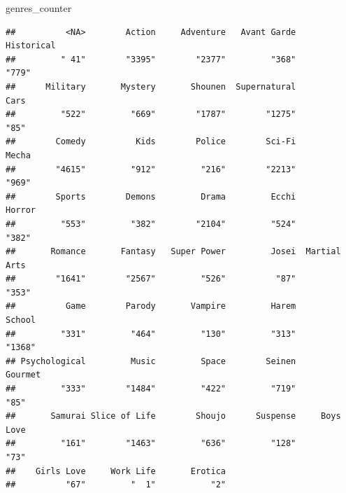 \documentclass[
]{article}
\newenvironment{Shaded}{\begin{snugshade}}{\end{snugshade}}
\newcommand{\AttributeTok}[1]{\textcolor[rgb]{0.77,0.63,0.00}{#1}}
\newcommand{\CommentTok}[1]{\textcolor[rgb]{0.56,0.35,0.01}{\textit{#1}}}
\newcommand{\DecValTok}[1]{\textcolor[rgb]{0.00,0.00,0.81}{#1}}
\newcommand{\FunctionTok}[1]{\textcolor[rgb]{0.00,0.00,0.00}{#1}}
\newcommand{\NormalTok}[1]{#1}
\newcommand{\OtherTok}[1]{\textcolor[rgb]{0.56,0.35,0.01}{#1}}
\newcommand{\SpecialCharTok}[1]{\textcolor[rgb]{0.00,0.00,0.00}{#1}}
\begin{document}
\begin{Shaded}
\begin{Highlighting}[]
\NormalTok{genres\_counter}
\end{Highlighting}
\end{Shaded}

\begin{verbatim}
##          <NA>        Action     Adventure   Avant Garde    Historical 
##         " 41"        "3395"        "2377"         "368"         "779" 
##      Military       Mystery       Shounen  Supernatural          Cars 
##         "522"         "669"        "1787"        "1275"          "85" 
##        Comedy          Kids        Police        Sci-Fi         Mecha 
##        "4615"         "912"         "216"        "2213"         "969" 
##        Sports        Demons         Drama         Ecchi        Horror 
##         "553"         "382"        "2104"         "524"         "382" 
##       Romance       Fantasy   Super Power         Josei  Martial Arts 
##        "1641"        "2567"         "526"          "87"         "353" 
##          Game        Parody       Vampire         Harem        School 
##         "331"         "464"         "130"         "313"        "1368" 
## Psychological         Music         Space        Seinen       Gourmet 
##         "333"        "1484"         "422"         "719"          "85" 
##       Samurai Slice of Life        Shoujo      Suspense     Boys Love 
##         "161"        "1463"         "636"         "128"          "73" 
##    Girls Love     Work Life       Erotica 
##          "67"         "  1"           "2"
\end{verbatim}

\begin{Shaded}
\end{Shaded}
\end{document}
